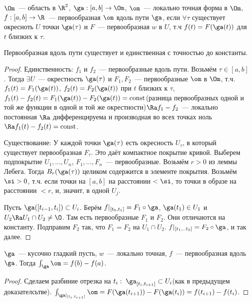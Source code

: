 \begin{definition}
    $\Om$~--- область в $\R^2$,
    $\ga : [a, b] \to \Om$,
    $\om$~--- локально точная форма в $\Om$,
    $f:[a, b] \to \R$~--- первообразная $\om$ вдоль пути $\ga$, если $\forall{\tau}$ существует окресноть $U$ точки $\ga(\tau)$ и $F$~--- первообразная $w$ в $U$, т.ч $f(t) = F(\ga(t))$ для $t$ близких к $\tau$.
\end{definition}

\begin{theorem} Первообразная вдоль пути существует и единственная с точностью до константы.
\end{theorem}

\begin{proof}
    Единственность: $f_1$ и $f_2$~--- первообразные вдоль пути.
    Возьмём $\tau \in [a,b]$. Тогда
    $\exists{U}$~--- окрестность $\ga(\tau)$ и $F_1, F_2$~--- первообразные $\om$ в $\Om$, т.ч.
    $f_1(t)=F_1(\ga(t))$, $f_2(t) =F_2(\ga(t))$ при $t$ близких к $\tau$,
    $f_1(t) - f_2(t) = F_1(\ga(t)) - F_2(\ga(t)) = \mathrm{const}$(разница первообразных одной и той же функции в одной и той же окрестности)$\Ra
        f_1-f_2$~--- локально постоянная $\Ra$ дифференцируема и производная во всех точках ноль $\Ra f_1(t) - f_2(t) = \mathrm{const}$.

    Существование: У каждой точки $\ga(\tau)$ есть окресность $U_{\tau}$, в который существует первообразная $F_{\tau}$. Это даёт компактное покрытие кривой.
    Выберем подпокрытие $U_1, \ldots, U_n$,  $F_1, \ldots, F_n$~--- первообразные.
    Возьмём $r>0$ из леммы Лебега. Тогда $B_r(\ga(\tau))$ целиком содержится в элементе покрытия.
    Возьмём $\si > 0$, т.ч. если точки на $[a, b]$ на расстоянии $< \si$, то точки в образе на расстоянии $<r$, и, значит, в одной $U_j$.

    Пусть $\ga([t_{i-1}, t_i]) \subset U_i$. Берём $f|_{[t_0, t_1]} = F_1 \circ \ga$,
    $\ga(t_1) \in U_1$ и $U_2 \Ra U_1  \cap U_2 \neq \O$.
    Там есть первообразные $F_1$ и $F_2$. Они отличаются на константу. Подправим $F_2$ так, что  $F_1=F_2$ на $U_1  \cap U_2$.
    $f|_{[t_1, .. t_2]} = F_2 \circ \ga$, и так далее.
\end{proof}

\begin{consequence}
    $\ga$~--- кусочно гладкий пусть, $w$~--- локально точная, $f$~---
    первообразная вдоль $\ga$. Тогда
    $\int_{\ga} \om = f(b)- f(a)$.
\end{consequence}

\begin{proof}
    Сделаем разбиние отрезка на $t_i : \;\ga_{[t_i, t_{i+1}]} \subset U_i$(как в предыдущем доказателсьтве).
    $\int_{\ga|_{[t_i, t_{i+1}]}} \om = F(\ga(t_{i+1})) - F(\ga(t_i)) = f(t_{i+1})-f(t_i)$.
\end{proof}


